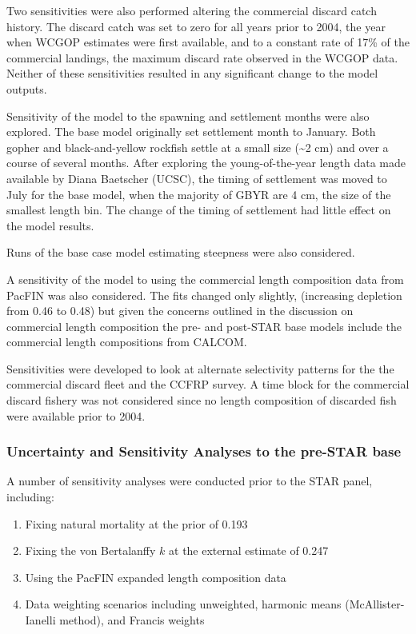 \documentclass[12pt,]{article}
\begin{document}
Two sensitivities were also performed altering the commercial discard
catch history. The discard catch was set to zero for all years prior to
2004, the year when WCGOP estimates were first available, and to a
constant rate of 17\% of the commercial landings, the maximum discard
rate observed in the WCGOP data. Neither of these sensitivities resulted
in any significant change to the model outputs.

Sensitivity of the model to the spawning and settlement months were also
explored. The base model originally set settlement month to January.
Both gopher and black-and-yellow rockfish settle at a small size
(\textasciitilde{}2 cm) and over a course of several months. After
exploring the young-of-the-year length data made available by Diana
Baetscher (UCSC), the timing of settlement was moved to July for the
base model, when the majority of GBYR are 4 cm, the size of the smallest
length bin. The change of the timing of settlement had little effect on
the model results.

Runs of the base case model estimating steepness were also considered.

A sensitivity of the model to using the commercial length composition
data from PacFIN was also considered. The fits changed only slightly,
(increasing depletion from 0.46 to 0.48) but given the concerns outlined
in the discussion on commercial length composition the pre- and
post-STAR base models include the commercial length compositions from
CALCOM.

Sensitivities were developed to look at alternate selectivity patterns
for the the commercial discard fleet and the CCFRP survey. A time block
for the commercial discard fishery was not considered since no length
composition of discarded fish were available prior to 2004.

\subsubsection{Uncertainty and Sensitivity Analyses to the pre-STAR
base}\label{uncertainty-and-sensitivity-analyses-to-the-pre-star-base}

A number of sensitivity analyses were conducted prior to the STAR panel,
including:

\begin{enumerate}

  \item Fixing natural mortality at the prior of 0.193
  
  \item Fixing the von Bertalanffy $k$ at the external estimate of 0.247
  
  \item Using the PacFIN expanded length composition data
  
  \item Data weighting scenarios including unweighted, harmonic means (McAllister-Ianelli method), and Francis weights

\end{enumerate}
\end{document}
